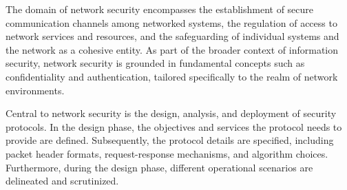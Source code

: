 



The domain of network security encompasses the establishment of secure communication channels among networked systems, the regulation of access to network services and resources, and the safeguarding of individual systems and the network as a cohesive entity. As part of the broader context of information security, network security is grounded in fundamental concepts such as confidentiality and authentication, tailored specifically to the realm of network environments.

Central to network security is the design, analysis, and deployment of security protocols. In the design phase, the objectives and services the protocol needs to provide are defined. Subsequently, the protocol details are specified, including packet header formats, request-response mechanisms, and algorithm choices. Furthermore, during the design phase, different operational scenarios are delineated and scrutinized.


